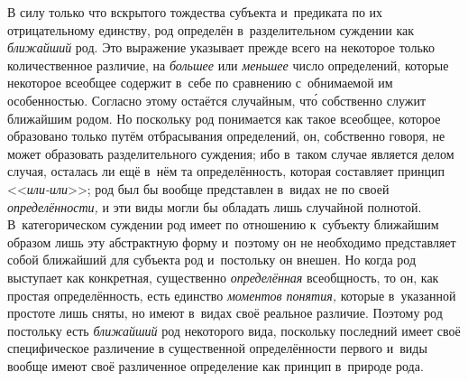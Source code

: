 В силу только что вскрытого тождества субъекта и~предиката по
их отрицательному единству, род определён в~разделительном суждении как
{\em ближайший} род. Это
выражение указывает прежде всего на некоторое только количественное
различие, на {\em большее} или {\em меньшее}
число определений, которые некоторое всеобщее содержит в~себе
по сравнению с~обнимаемой им особенностью. Согласно этому остаётся
случайным, чт\'{о} собственно служит ближайшим родом. Но поскольку род
понимается как такое всеобщее, которое образовано только путём отбрасывания
определений, он, собственно говоря, не может образовать разделительного
суждения; ибо в~таком случае является делом случая, осталась ли ещё в~нём
та определённость, которая составляет принцип <<{\em или-или}>>; род был
бы вообще представлен в~видах не по своей {\em определённости,} и
эти виды могли бы обладать лишь случайной полнотой. В~категорическом
суждении род имеет по отношению к~субъекту ближайшим образом лишь эту
абстрактную форму и~поэтому он не необходимо представляет собой ближайший
для субъекта род и~постольку он внешен. Но когда род выступает как
конкретная, существенно {\em определённая}
всеобщность, то он, как простая определённость, есть единство
{\em моментов понятия,}
которые в~указанной простоте лишь сняты, но
имеют в~видах своё реальное различие. Поэтому род постольку есть
{\em ближайший} род
некоторого вида, поскольку последний имеет своё специфическое различение в
существенной определённости первого и~виды вообще имеют своё различенное
определение как принцип в~природе рода.

